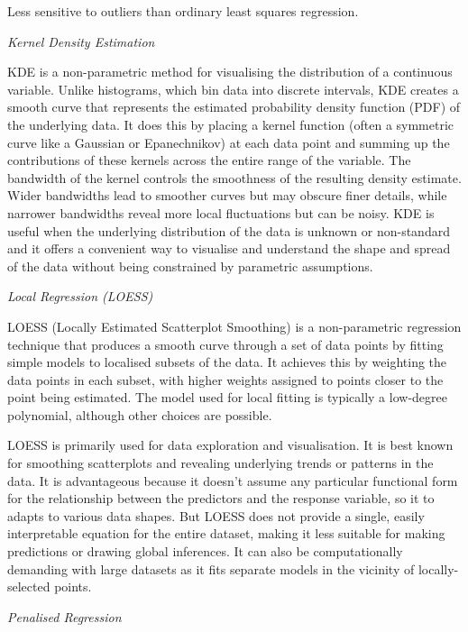 \documentclass[
  letterpaper,
]{book}
\begin{document}
Less sensitive to outliers than ordinary least squares regression.

\emph{Kernel Density Estimation}

KDE is a non-parametric method for visualising the distribution of a
continuous variable. Unlike histograms, which bin data into discrete
intervals, KDE creates a smooth curve that represents the estimated
probability density function (PDF) of the underlying data. It does this
by placing a kernel function (often a symmetric curve like a Gaussian or
Epanechnikov) at each data point and summing up the contributions of
these kernels across the entire range of the variable. The bandwidth of
the kernel controls the smoothness of the resulting density estimate.
Wider bandwidths lead to smoother curves but may obscure finer details,
while narrower bandwidths reveal more local fluctuations but can be
noisy. KDE is useful when the underlying distribution of the data is
unknown or non-standard and it offers a convenient way to visualise and
understand the shape and spread of the data without being constrained by
parametric assumptions.

\emph{Local Regression (LOESS)}

LOESS (Locally Estimated Scatterplot Smoothing) is a non-parametric
regression technique that produces a smooth curve through a set of data
points by fitting simple models to localised subsets of the data. It
achieves this by weighting the data points in each subset, with higher
weights assigned to points closer to the point being estimated. The
model used for local fitting is typically a low-degree polynomial,
although other choices are possible.

LOESS is primarily used for data exploration and visualisation. It is
best known for smoothing scatterplots and revealing underlying trends or
patterns in the data. It is advantageous because it doesn't assume any
particular functional form for the relationship between the predictors
and the response variable, so it to adapts to various data shapes. But
LOESS does not provide a single, easily interpretable equation for the
entire dataset, making it less suitable for making predictions or
drawing global inferences. It can also be computationally demanding with
large datasets as it fits separate models in the vicinity of
locally-selected points.

\emph{Penalised Regression}
\end{document}

